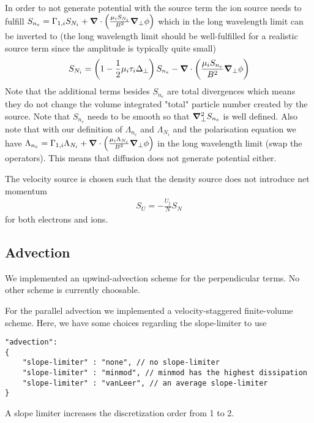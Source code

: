 In order to not generate potential with the source term the
ion source needs to fulfill $S_{n_e} = \Gamma_{1,i}S_{N_i} + {\boldsymbol{\nabla}}\cdot\left( \frac{\mu_i S_{N_i}}{B^2}{\boldsymbol{\nabla}}_{\perp} \phi\right)$ which in the long wavelength limit can be inverted to (the long wavelength limit should be well-fulfilled for a realistic source term since the amplitude is typically quite small)
\begin{align}
    S_{N_i} = \left(1-\frac{1}{2}\mu_i \tau_i \Delta_\perp\right) S_{n_e} -{\boldsymbol{\nabla}}\cdot\left( \frac{\mu_i S_{n_e}}{B^2}{\boldsymbol{\nabla}}_{\perp} \phi\right)
  \label{eq:ion_source}
\end{align}
Note that the additional terms besides $S_{n_e}$ are total divergences which means
they do not change the volume integrated "total" particle number created by the source.
Note that $S_{n_e}$ needs to be smooth
so that ${\boldsymbol{\nabla}}_{\perp}^2 S_{n_e}$ is well defined.
Also note that with our definition of $\Lambda_{n_e}$ and $\Lambda_{N_i}$ and
the polarisation equation we have $\Lambda_{n_e} = \Gamma_{1,i}\Lambda_{N_i} + {\boldsymbol{\nabla}}\cdot\left( \frac{\mu_i \Lambda_{N_i}}{B^2}{\boldsymbol{\nabla}}_{\perp} \phi\right)$ in the long wavelength limit (swap the operators).
This means that diffusion does not generate potential either.

The velocity source is chosen such that the density source does not introduce
net momentum
\begin{align}
    S_U = -\frac{U_\parallel}{N} S_N
    \label{eq:velocity_source}
\end{align}
for both electrons and ions.

\subsection{Advection}
We implemented an upwind-advection scheme for the perpendicular terms.
No other scheme is currently choosable.

For the parallel advection we implemented a velocity-staggered finite-volume
scheme. Here, we have some choices regarding the slope-limiter to use
\begin{verbatim}
"advection":
{
    "slope-limiter" : "none", // no slope-limiter
    "slope-limiter" : "minmod", // minmod has the highest dissipation
    "slope-limiter" : "vanLeer", // an average slope-limiter
}
\end{verbatim}
\begin{tcolorbox}[title=Note]
    A slope limiter increases the discretization order from 1 to 2.
\end{tcolorbox}
